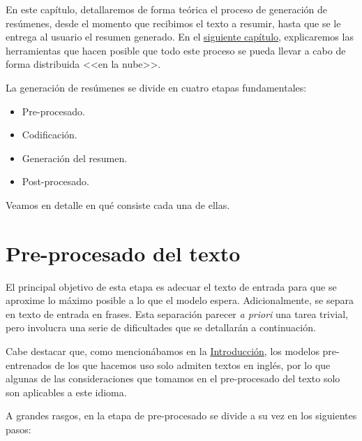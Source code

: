  \label{chapter:conceptos}

En este capítulo, detallaremos de forma teórica el proceso de generación de resúmenes, desde el momento que recibimos el texto a resumir, hasta que se le entrega al usuario el resumen generado. En el \hyperref[chapter:tecnicas]{siguiente capítulo}, explicaremos las herramientas que hacen posible que todo este proceso se pueda llevar a cabo de forma distribuida <<en la nube>>.

La generación de resúmenes se divide en cuatro etapas fundamentales:

\vspace*{-\baselineskip}
\begin{itemize}
	\item [\textbullet] Pre-procesado.
	\item [\textbullet] Codificación.
	\item [\textbullet] Generación del resumen.
	\item [\textbullet] Post-procesado.
\end{itemize}

Veamos en detalle en qué consiste cada una de ellas.

\bigskip
\section{Pre-procesado del texto} \label{sec:preprocesado}

El principal objetivo de esta etapa es adecuar el texto de entrada para que se aproxime lo máximo posible a lo que el modelo espera. Adicionalmente, se separa en texto de entrada en frases. Esta separación parecer \emph{a priori} una tarea trivial, pero involucra una serie de dificultades que se detallarán a continuación.

Cabe destacar que, como mencionábamos en la \hyperref[chapter:intro]{Introducción}, los modelos pre-entrenados de los que hacemos uso solo admiten textos en inglés, por lo que algunas de las consideraciones que tomamos en el pre-procesado del texto solo son aplicables a este idioma.

A grandes rasgos, en la etapa de pre-procesado se divide a su vez en los siguientes pasos:

\vspace{-0.4cm}

